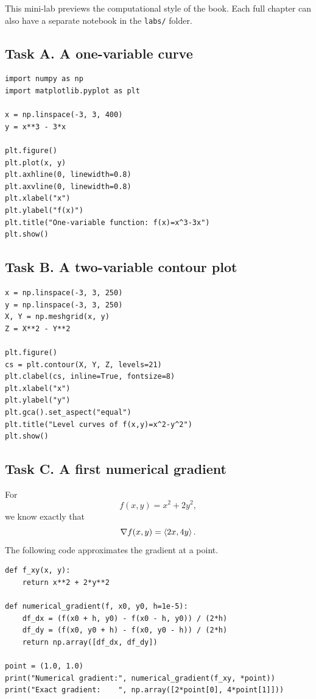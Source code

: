 This mini-lab previews the computational style of the book. Each full chapter can also have a separate notebook in the \texttt{labs/} folder.

\subsection*{Task A. A one-variable curve}
\begin{lstlisting}[style=pythonstyle]
import numpy as np
import matplotlib.pyplot as plt

x = np.linspace(-3, 3, 400)
y = x**3 - 3*x

plt.figure()
plt.plot(x, y)
plt.axhline(0, linewidth=0.8)
plt.axvline(0, linewidth=0.8)
plt.xlabel("x")
plt.ylabel("f(x)")
plt.title("One-variable function: f(x)=x^3-3x")
plt.show()
\end{lstlisting}

\subsection*{Task B. A two-variable contour plot}
\begin{lstlisting}[style=pythonstyle]
x = np.linspace(-3, 3, 250)
y = np.linspace(-3, 3, 250)
X, Y = np.meshgrid(x, y)
Z = X**2 - Y**2

plt.figure()
cs = plt.contour(X, Y, Z, levels=21)
plt.clabel(cs, inline=True, fontsize=8)
plt.xlabel("x")
plt.ylabel("y")
plt.gca().set_aspect("equal")
plt.title("Level curves of f(x,y)=x^2-y^2")
plt.show()
\end{lstlisting}

\subsection*{Task C. A first numerical gradient}
For
\[
  f(x,y)=x^2+2y^2,
\]
we know exactly that
\[
  \nabla f(x,y)=\left\langle 2x,4y\right\rangle.
\]
The following code approximates the gradient at a point.
\begin{lstlisting}[style=pythonstyle]
def f_xy(x, y):
    return x**2 + 2*y**2

def numerical_gradient(f, x0, y0, h=1e-5):
    df_dx = (f(x0 + h, y0) - f(x0 - h, y0)) / (2*h)
    df_dy = (f(x0, y0 + h) - f(x0, y0 - h)) / (2*h)
    return np.array([df_dx, df_dy])

point = (1.0, 1.0)
print("Numerical gradient:", numerical_gradient(f_xy, *point))
print("Exact gradient:    ", np.array([2*point[0], 4*point[1]]))
\end{lstlisting}

